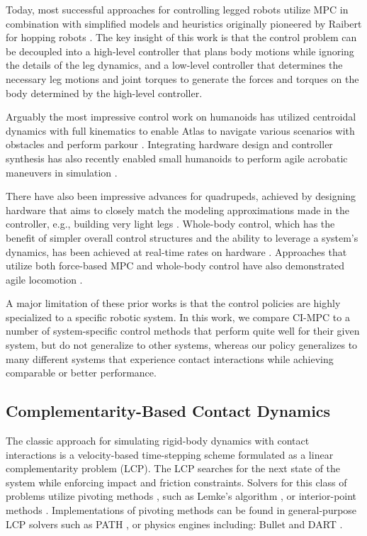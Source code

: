 Today, most successful approaches for controlling legged robots utilize MPC in combination with simplified models and heuristics originally pioneered by Raibert for hopping robots \cite{raibert1989dynamically}. The key insight of this work is that the control problem can be decoupled into a high-level controller that plans body motions while ignoring the details of the leg dynamics, and a low-level controller that determines the necessary leg motions and joint torques to generate the forces and torques on the body determined by the high-level controller.

Arguably the most impressive control work on humanoids has utilized centroidal dynamics with full kinematics to enable Atlas to navigate various scenarios with obstacles \cite{dai2014whole} and perform parkour \cite{atlas2019parkour}. Integrating hardware design and controller synthesis has also recently enabled small humanoids to perform agile acrobatic maneuvers in simulation \cite{chignoli2021humanoid}.

There have also been impressive advances for quadrupeds, achieved by designing hardware that aims to closely match the modeling approximations made in the controller, e.g., building very light legs \cite{bledt2020regularized}. Whole-body control, which has the benefit of simpler overall control structures and the ability to leverage a system's dynamics, has been achieved at real-time rates on hardware \cite{neunert2018whole}. Approaches that utilize both force-based MPC and whole-body control have also demonstrated agile locomotion \cite{kim2019highly}.

A major limitation of these prior works is that the control policies are highly specialized to a specific robotic system. In this work, we compare CI-MPC to a number of system-specific control methods that perform quite well for their given system, but do not generalize to other systems, whereas our policy generalizes to many different systems that experience contact interactions while achieving comparable or better performance.

\subsection{Complementarity-Based Contact Dynamics}
The classic approach for simulating rigid-body dynamics with contact interactions is a velocity-based time-stepping scheme formulated as a linear complementarity problem (LCP). The LCP searches for the next state of the system while enforcing impact and friction constraints. Solvers for this class of problems utilize pivoting methods 
\cite{drumwright2015rapidly}, such as Lemke's algorithm \cite{cottle2009linear}, or interior-point methods \cite{kojima1991unified}. Implementations of pivoting methods can be found in general-purpose LCP solvers such as PATH \cite{dirkse1995path}, or physics engines including: Bullet \cite{coumans2019} and DART \cite{lee2018dart}. 

